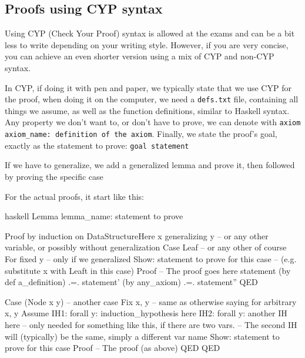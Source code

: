 \newpage
\subsection{Proofs using CYP syntax}
\label{sec:cyp}
Using CYP (Check Your Proof) syntax is allowed at the exams and can be a bit less to write depending on your writing style.
However, if you are very concise, you can achieve an even shorter version using a mix of CYP and non-CYP syntax.

In CYP, if doing it with pen and paper, we typically state that we use CYP for the proof,
when doing it on the computer, we need a \texttt{defs.txt} file, containing all things we assume,
as well as the function definitions, similar to Haskell syntax.
Any property we don't want to, or don't have to prove, we can denote with \texttt{axiom axiom\_name: definition of the axiom}.
Finally, we state the proof's goal, exactly as the statement to prove:
\verb|goal statement|

If we have to generalize, we add a generalized lemma and prove it, then followed by proving the specific case

For the actual proofs, it start like this:
\begin{code}{haskell}
    Lemma lemma_name: statement to prove

    Proof by induction on DataStructureHere x generalizing y -- or any other variable, or possibly without generalization
    Case Leaf -- or any other of course
        For fixed y -- only if we generalized
        Show: statement to prove for this case -- (e.g. substitute x with Leaft in this case)
        Proof
            -- The proof goes here
            statement
            (by def a_definition) .=. statement'
            (by any_axiom)        .=. statement''
        QED
    
    Case (Node x y) -- another case
        Fix x, y -- same as otherwise saying for arbitrary x, y
        Assume
            IH1: forall y: induction_hypothesis here
            IH2: forall y: another IH here -- only needed for something like this, if there are two vars.
            -- The second IH will (typically) be the same, simply a different var name
        Show: statement to prove for this case
        Proof
        -- The proof (as above)
        QED
    QED
\end{code}
